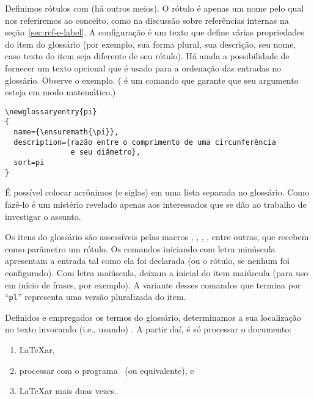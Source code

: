 Definimos rótulos com
(há outros meios). O rótulo é apenas um nome pelo qual nos referiremos
ao conceito, como na discussão sobre referências internas na
seção~\ref{sec:ref-e-label}. A configuração é um texto que define
várias propriedades do item do glossário (por exemplo, sua forma plural, sua
descrição, seu nome, caso texto do item seja diferente de seu
rótulo). Há ainda a possibilidade de fornecer um texto opcional que é
usado para a ordenação das entradas no glossário. Observe o
exemplo. ( é um comando que garante que seu
argumento esteja em modo matemático.)

\begin{verbatim}
\newglossaryentry{pi}
{
  name={\ensuremath{\pi}},
  description={razão entre o comprimento de uma circunferência 
               e seu diâmetro},
  sort=pi
}
\end{verbatim}

É possível colocar acrônimos (e siglas) em uma lista separada no
glossário. Como fazê-lo é um mistério revelado apenas aos interessados
que se dão ao trabalho de investigar o assunto.

Os itens do glossário são  assessíveis pelas macros
, , , ,
entre outras, que recebem como parâmetro um rótulo. Os comandos
iniciando com letra minúscula apresentam a entrada tal como ela foi
declarada (ou o rótulo, se nenhum  foi
configurado). Com letra maiúscula, deixam a inicial do item maiúscula
(para uso em início de frases, por exemplo). A variante desses
comandos que termina por ``{\tt pl}'' representa uma versão
pluralizada do item.

Definidos e empregados os termos do glossário, determinamos a
sua localização no texto invocando (i.e., usando)
. A partir daí, é só processar o documento:
\begin{enumerate}
\item \LaTeX ar,
\item processar com o programa~ (ou
  equivalente), e
\item \LaTeX ar mais duas vezes.
\end{enumerate}
